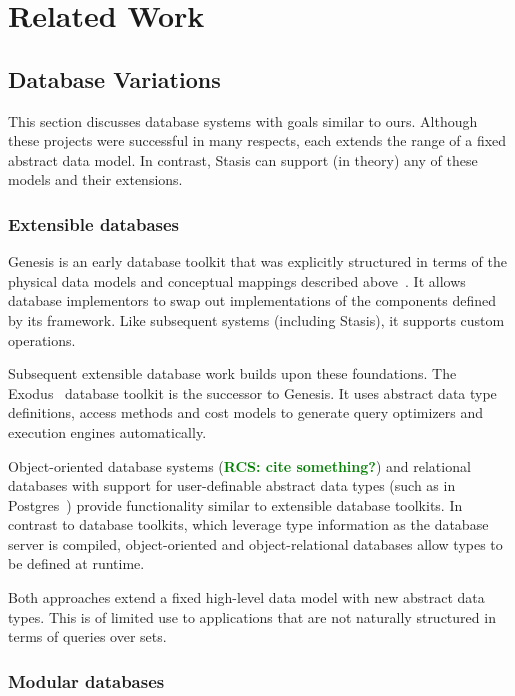 \documentclass[letterpaper,twocolumn,10pt]{article}
\newcommand{\yad}{Stasis\xspace}
\newcommand{\rcs}[1]{\textcolor{green}{\bf RCS: #1}}
\begin{document}
\section{Related Work}
\label{sec:related-work}

\subsection{Database Variations} 
\label{sec:otherDBs}

This section discusses database systems with goals similar to ours.
Although these projects were successful in many respects, each extends
the range of a fixed abstract data model.  In contrast, \yad can
support (in theory) any of these models and their extensions.

\subsubsection{Extensible databases}

Genesis is an early database toolkit that was explicitly structured in
terms of the physical data models and conceptual mappings described
above~\cite{genesis}.  It allows database implementors to swap out
implementations of the components defined by its framework.  Like
subsequent systems (including \yad), it supports custom operations.

Subsequent extensible database work builds upon these foundations.
The Exodus~\cite{exodus} database toolkit is the successor to
Genesis. It uses abstract data type definitions, access methods and
cost models to  generate query optimizers and execution
engines automatically.

Object-oriented database systems (\rcs{cite something?}) and
relational databases with support for user-definable abstract data
types (such as in Postgres~\cite{postgres}) provide functionality
similar to extensible database toolkits.  In contrast to database
toolkits, which leverage type information as the database server is
compiled, object-oriented and object-relational databases allow types
to be defined at runtime.

Both approaches extend a fixed high-level data model with new
abstract data types.  This is of limited use to applications that are
not naturally structured in terms of queries over sets.

\subsubsection{Modular databases}
\end{document}
